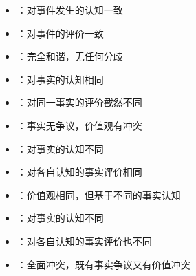\begin{theorembox}[title=四种关系类型的系统分析]
\begin{itemize}
  \item {}：对事件发生的认知一致
  \item {}：对事件的评价一致
  \item {}：完全和谐，无任何分歧
\end{itemize}

\begin{itemize}
  \item {}：对事实的认知相同
  \item {}：对同一事实的评价截然不同
  \item {}：事实无争议，价值观有冲突
\end{itemize}

\begin{itemize}
  \item {}：对事实的认知不同
  \item {}：对各自认知的事实评价相同
  \item {}：价值观相同，但基于不同的事实认知
\end{itemize}

\begin{itemize}
  \item {}：对事实的认知不同
  \item {}：对各自认知的事实评价也不同
  \item {}：全面冲突，既有事实争议又有价值冲突
\end{itemize}
\end{theorembox}

